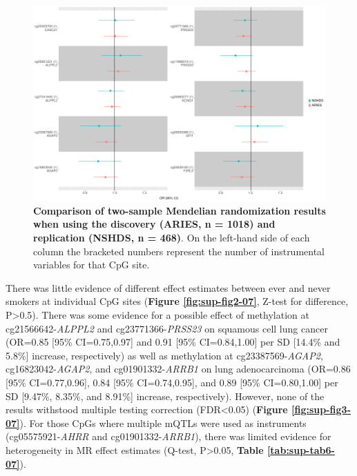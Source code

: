 \documentclass[11pt,oneside]{bristolthesis}
\begin{document}
\begin{figure}

{\centering \includegraphics[width=1\linewidth]{figure/07-dnam_lungcancer_mr/sup_fig1} 

}

\caption[Comparison of two-sample Mendelian randomization results when using the discovery (ARIES, n = 1018) and replication (NSHDS, n = 468)]{\textbf{Comparison of two-sample Mendelian randomization results when using the discovery (ARIES, n = 1018) and replication (NSHDS, n = 468)}. On the left-hand side of each column the bracketed numbers represent the number of instrumental variables for that CpG site.}\label{fig:sup-fig1-07}
\end{figure}
There was little evidence of different effect estimates between ever and never smokers at individual CpG sites (\textbf{Figure \ref{fig:sup-fig2-07}}, Z-test for difference, P\textgreater0.5). There was some evidence for a possible effect of methylation at cg21566642-\emph{ALPPL2} and cg23771366-\emph{PRSS23} on squamous cell lung cancer (OR=0.85 {[}95\% CI=0.75,0.97{]} and 0.91 {[}95\% CI=0.84,1.00{]} per SD {[}14.4\% and 5.8\%{]} increase, respectively) as well as methylation at cg23387569-\emph{AGAP2}, cg16823042-\emph{AGAP2}, and cg01901332-\emph{ARRB1} on lung adenocarcinoma (OR=0.86 {[}95\% CI=0.77,0.96{]}, 0.84 {[}95\% CI=0.74,0.95{]}, and 0.89 {[}95\% CI=0.80,1.00{]} per SD {[}9.47\%, 8.35\%, and 8.91\%{]} increase, respectively). However, none of the results withstood multiple testing correction (FDR\textless0.05) (\textbf{Figure \ref{fig:sup-fig3-07}}). For those CpGs where multiple mQTLs were used as instruments (cg05575921-\emph{AHRR} and cg01901332-\emph{ARRB1}), there was limited evidence for heterogeneity in MR effect estimates (Q-test, P\textgreater0.05, \textbf{Table \ref{tab:sup-tab6-07}}).
\end{document}
